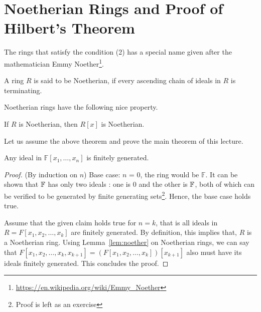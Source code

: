 \section{Noetherian Rings and Proof of Hilbert's Theorem}
The rings that satisfy the condition (2) has a special name given after the
mathematician Emmy Noether\footnote{\url{https://en.wikipedia.org/wiki/Emmy_Noether}}.

\begin{definition}
	A ring $R$ is said to be Noetherian, if every ascending chain of
	ideals in $R$ is terminating.
\end{definition}
Noetherian rings have the following nice property.
\begin{lemma} \label{lem:noether}
If $R$ is Noetherian, then $R[x]$ is Noetherian.
\end{lemma}

Let us assume the above theorem and prove the main theorem of this lecture.
\begin{theorem}
Any ideal in $\mathbb{F}[x_1,\ldots,x_n]$ is finitely generated.
\end{theorem}
\begin{proof}(By induction on $n$)
Base case: $n$ = 0, the ring would be $\mathbb{F}$. It can be shown that
${\mathbb{F}}$ has only two ideals : one is ${0}$ and the other is ${\mathbb{F}}$, both
of which can be verified to be generated by finite generating sets\footnote{
Proof is left as an exercise}. Hence, the base case holds true.

Assume that the given claim holds true for $n=k$, that is all ideals in 
$R = F[x_1,x_2,\ldots,x_k]$ are finitely generated. By definition, this implies
that, $R$ is a Noetherian ring. Using Lemma~\ref{lem:noether} on Noetherian
rings, we can say that $F[x_1,x_2,\ldots,x_k,x_{k+1}] =
(F[x_1,x_2,\ldots,x_k])[x_{k+1}]$ also must have its ideals finitely
generated. This concludes the proof.
\end{proof}

